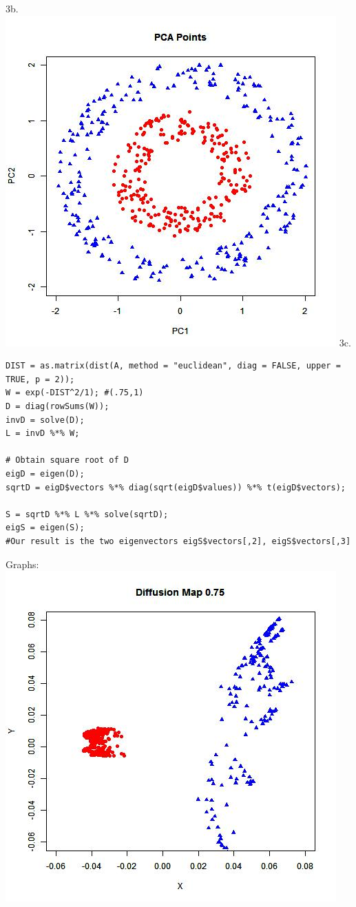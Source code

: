 \documentclass[12pt]{article}
\begin{document}
3b. \\
\includegraphics[scale = .65]{PCApoints.jpeg}
\newpage
3c.
\begin{lstlisting}
DIST = as.matrix(dist(A, method = "euclidean", diag = FALSE, upper = TRUE, p = 2));
W = exp(-DIST^2/1); #(.75,1)
D = diag(rowSums(W));
invD = solve(D);
L = invD %*% W;

# Obtain square root of D
eigD = eigen(D);
sqrtD = eigD$vectors %*% diag(sqrt(eigD$values)) %*% t(eigD$vectors);

S = sqrtD %*% L %*% solve(sqrtD);
eigS = eigen(S);
#Our result is the two eigenvectors eigS$vectors[,2], eigS$vectors[,3]
\end{lstlisting}
Graphs: \\
\includegraphics[scale = .55]{DiffusionMap075.jpeg}
\end{document}
